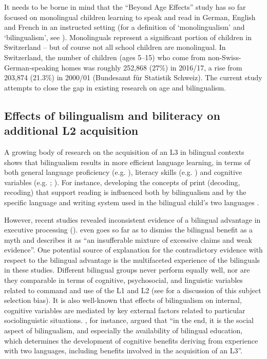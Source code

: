 \documentclass[output=paper,modfonts,nonflat,newtxmath]{langsci/langscibook}
\begin{document}
It needs to be borne in mind that the “Beyond Age Effects” study has so far focused on monolingual children learning to speak and read in German, English and French in an instructed setting (for a definition of ‘monolingualism’ and ‘bilingualism’, see ). Monolinguals represent a significant portion of children in Switzerland – but of course not all school children are monolingual. In Switzerland, the number of children (ages 5–15) who come from non-Swiss-German-speaking homes was roughly 252,868 (27\%) in 2016/17, a rise from 203,874 (21.3\%) in 2000/01 (Bundesamt für Statistik Schweiz). The current study attempts to close the gap in existing research on age and bilingualism.

\subsection{{Effects} {of} {bilingualism} {and} {biliteracy} {on} {additional} {L2} {acquisition}}
\label{sec:pfenninger:2.2.}

A growing body of research on the acquisition of an L3 in bilingual contexts shows that bilingualism results in more efficient language learning, in terms of both general language proficiency (e.g. \citealt{Lasagabaster2000, Muñoz2000}), literacy skills (e.g. \citealt{KovelmanEtAl2008}) and cognitive variables (e.g. \citealt{Bialystok2007}; \citealt{AdesopeEtAl2010}). For instance, developing the concepts of print (decoding, recoding) that support reading is influenced both by bilingualism and by the specific language and writing system used in the bilingual child’s two languages \citep{BialystokEtAl2005a, KovelmanEtAl2008}.

However, recent studies revealed inconsistent evidence of a bilingual advantage in executive processing (\citealt{PaapGreenberg2013, deBruinEtAl2014, YowLi2015}). \citet[929]{Morton2014} even goes so far as to dismiss the bilingual benefit as a myth and describes it as “an insufferable mixture of excessive claims and weak evidence”. One potential source of explanation for the contradictory evidence with respect to the bilingual advantage is the multifaceted experience of the bilinguals in these studies. Different bilingual groups never perform equally well, nor are they comparable in terms of cognitive, psychosocial, and linguistic variables related to command and use of the L1 and L2 (see \citealt{DeAngelis2015} for a discussion of this subject selection bias). It is also well-known that effects of bilingualism on internal, cognitive variables are mediated by key external factors related to particular sociolinguistic situations. \citet[225]{Sanz2008}, for instance, argued that “in the end, it is the social aspect of bilingualism, and especially the availability of bilingual education, which determines the development of cognitive benefits deriving from experience with two languages, including benefits involved in the acquisition of an L3”.
\end{document}
